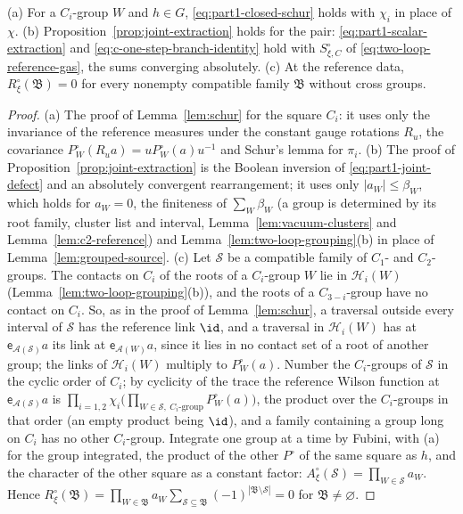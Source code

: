\begin{lemma}\label{lem:two-loop-schur}
(a) For a $C_i$-group $W$ and $h\in G$, \eqref{eq:part1-closed-schur} holds with $\chi_i$ in place of $\chi$. (b) Proposition~\ref{prop:joint-extraction} holds for the pair: \eqref{eq:part1-scalar-extraction} and \eqref{eq:c-one-step-branch-identity} hold with $S^\circ_{\xi,C}$ of \eqref{eq:two-loop-reference-gas}, the sums converging absolutely. (c) At the reference data, $R^\circ_\xi(\mathfrak B)=0$ for every nonempty compatible family $\mathfrak B$ without cross groups.
\end{lemma}

\begin{proof}
(a) The proof of Lemma~\ref{lem:schur} for the square $C_i$: it uses only the invariance of the reference measures under the constant gauge rotations $R_u$, the covariance $P^\circ_W(R_ua)=uP^\circ_W(a)u^{-1}$ and Schur's lemma for $\pi_i$. (b) The proof of Proposition~\ref{prop:joint-extraction} is the Boolean inversion of \eqref{eq:part1-joint-defect} and an absolutely convergent rearrangement; it uses only $|a_W|\leq\beta_W$, which holds for $a_W=0$, the finiteness of $\sum_W\beta_W$ (a group is determined by its root family, cluster list and interval, Lemma~\ref{lem:vacuum-clusters} and Lemma~\ref{lem:c2-reference}) and Lemma~\ref{lem:two-loop-grouping}(b) in place of Lemma~\ref{lem:grouped-source}. (c) Let $\mathcal S$ be a compatible family of $C_1$- and $C_2$-groups. The contacts on $C_i$ of the roots of a $C_i$-group $W$ lie in $\mathcal H_i(W)$ (Lemma~\ref{lem:two-loop-grouping}(b)), and the roots of a $C_{3-i}$-group have no contact on $C_i$. So, as in the proof of Lemma~\ref{lem:schur}, a traversal outside every interval of $\mathcal S$ has the reference link $\id$, and a traversal in $\mathcal H_i(W)$ has at $\mathsf e_{\mathcal A(\mathcal S)}a$ its link at $\mathsf e_{\mathcal A(W)}a$, since it lies in no contact set of a root of another group; the links of $\mathcal H_i(W)$ multiply to $P^\circ_W(a)$. Number the $C_i$-groups of $\mathcal S$ in the cyclic order of $C_i$; by cyclicity of the trace the reference Wilson function at $\mathsf e_{\mathcal A(\mathcal S)}a$ is $\prod_{i=1,2}\chi_i\bigl(\prod_{W\in\mathcal S,\ C_i\text{-group}}P^\circ_W(a)\bigr)$, the product over the $C_i$-groups in that order (an empty product being $\id$), and a family containing a group long on $C_i$ has no other $C_i$-group. Integrate one group at a time by Fubini, with (a) for the group integrated, the product of the other $P^\circ$ of the same square as $h$, and the character of the other square as a constant factor: $A^\circ_\xi(\mathcal S)=\prod_{W\in\mathcal S}a_W$. Hence $R^\circ_\xi(\mathfrak B)=\prod_{W\in\mathfrak B}a_W\sum_{\mathcal S\subseteq\mathfrak B}(-1)^{|\mathfrak B\setminus\mathcal S|}=0$ for $\mathfrak B\neq\varnothing$.
\end{proof}

